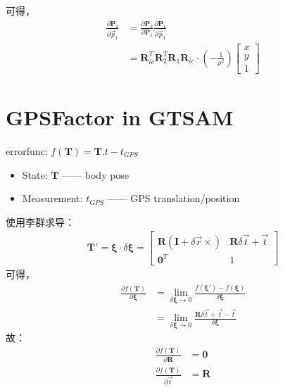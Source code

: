 \documentclass{article}
\begin{document}
可得，
\begin{equation}
	\begin{aligned}
		\frac{\partial{\boldsymbol{P}_2}} {\partial{\vec{p}_1}} &=\frac{\partial{\boldsymbol{P}_2}} {\partial{\boldsymbol{P}_1}} \frac{\partial{\boldsymbol{P}_1}} {\partial{\vec{p}_1}} \\
		&= \boldsymbol{R}_{ic}^{T}\boldsymbol{R}_2^{T}\boldsymbol{R}_1\boldsymbol{R}_{ic}\cdot 
		\left(-\frac{1}{\rho^2}\right)
		\left[
		\begin{matrix}
		x\\
		y\\
		1
		\end{matrix}
		\right] 
	\end{aligned}
\end{equation}

\section{GPSFactor in GTSAM}
errorfunc: $f(\boldsymbol{T}) = \boldsymbol{T}.t - t_{GPS}$
\begin{itemize}
	\item State:  $\boldsymbol{T}$ —— body pose 
	\item Measurement:  $t_{GPS}$ —— GPS translation/position
\end{itemize}
使用李群求导：
\begin{equation}
	\begin{aligned}
		\boldsymbol{T}'                          =\boldsymbol{\xi} \cdot \delta \boldsymbol{\xi} = 
		\left[ 
		\begin{matrix} 
		\boldsymbol{R}(\boldsymbol{I}+\delta \vec{r}\times) & \boldsymbol{R}\delta \vec{t}+\vec{t}          \\ 
		\boldsymbol{0}^T                            & 1                                                   
		\end{matrix}
		\right]
	\end{aligned}
\end{equation}
可得，
\begin{equation}
	\begin{aligned}
		\frac{\partial{f(\boldsymbol{T})}}{\partial{\boldsymbol{\xi}}} & = 
		\lim_{\delta\boldsymbol{\xi}\rightarrow0}\frac{f(\boldsymbol{\xi}')-  f(\boldsymbol{\xi})}{\delta\boldsymbol{\xi}}\\&=
		\lim_{\delta\boldsymbol{\xi}\rightarrow0}\frac{\boldsymbol{R}\delta \vec{t}+\vec{t} - \vec{t}}{\delta\boldsymbol{\xi}}
	\end{aligned}
\end{equation}
故：
\begin{equation}
	\begin{aligned}
		\frac{\partial{f(\boldsymbol{T})}}{\partial{\boldsymbol{R}}} & = \boldsymbol{0} \\
		\frac{\partial{f(\boldsymbol{T})}}{\partial{\vec{t}}} & = \boldsymbol{R}
	\end{aligned}
\end{equation}
\end{document}

